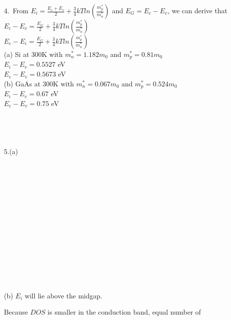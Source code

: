 \documentclass[11pt,oneside,a4paper]{article}
\begin{document}
4.\ From \(E_i=\frac{E_c+E_v}{2}+\frac{3}{4}kTln\left(\frac{m_p^*}{m_n^*}\right)\) and \(E_G=E_c-E_v\), we can derive that \\

\hspace{8.5mm} \(E_i-E_v=\frac{E_G}{2}+\frac{3}{4}kTln\left(\frac{m_p^*}{m_n^*}\right)\) \\

\hspace{8.5mm} \(E_c-E_i=\frac{E_G}{2}+\frac{3}{4}kTln\left(\frac{m_p^*}{m_n^*}\right)\) \\

\quad (a) Si at 300K with \(m_n^*=1.182m_0\) and \(m_p^*=0.81m_0\) \\

\hspace{8.5mm} \(E_i-E_v=0.5527\) eV \\

\hspace{8.5mm} \(E_c-E_v=0.5673\) eV \\

\quad (b) GaAs at 300K with \(m_n^*=0.067m_0\) and \(m_p^*=0.524m_0\) \\

\hspace{8.5mm} \(E_i-E_v=0.67\) eV \\

\hspace{8.5mm} \(E_c-E_v=0.75\) eV \\ 
\\
\\
\\
\\

5.\:(a) \\
\\
\\
\\
\\
\\
\\
\\
\\
\\
\\
\\
\\
\\
\\

\quad (b) \(E_i\) will lie above the midgap.

\hspace{8.5mm} Because \(DOS\) is smaller in the conduction band, equal number of 
\end{document}
